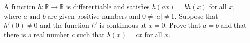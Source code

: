 A function $h : \mathbb{R} \rightarrow \mathbb{R}$ is differentiable and satisfies $h(ax) = bh(x)$ for all $x$, where $a$ and $b$ are given positive numbers and $0 \not = |a| \not = 1$. Suppose that $h'(0) \not = 0$ and the function $h'$ is continuous at $x = 0$. Prove that $a = b$ and that there is a real number $c$ such that $h(x) = cx$ for all $x$.